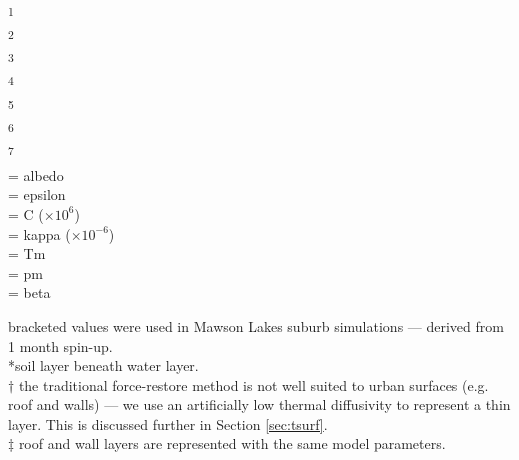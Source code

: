 \documentclass[final,3p,times,authoryear]{elsarticle}
\begin{document}
\begin{table}
\begin{center}
\begin{tabular}{  p{2.5cm} p{1.3cm} p{1.3cm} p{1.3cm} p{1.3cm} p{1.3cm} p{1.3cm} p{1.3cm} p{1.3cm} p{1.3cm}}
\hline
  \end{tabular}
  \end{center}
\footnotesize{\textsuperscript{1} \cite{Oke1987z}\\}
\footnotesize{\textsuperscript{2} \cite{stewart2014evaluation}\\}
\footnotesize{\textsuperscript{3} \cite{Jarvi2014a} \\}
\footnotesize{\textsuperscript{4} \cite{Narita1984} \\ }
\footnotesize{\textsuperscript{5} \cite{Asaeda1993}  \\}
\footnotesize{\textsuperscript{6} \cite{Grimmond1993}\\}
\footnotesize{\textsuperscript{7} \cite{Doll1985}\\}
\footnotesize{ = \glsdesc{albedo}} \\
\footnotesize{ = \glsdesc{epsilon}} \\
\footnotesize{ = \glsdesc{C} ($\times10^{6}$) \\ }
\footnotesize{ = \glsdesc{kappa}  ($\times10^{-6}$)} \\
\footnotesize{ = \glsdesc{Tm}}\\
\footnotesize{ = \glsdesc{pm}} \\
\footnotesize{ = \glsdesc{beta}}


\footnotesize{ bracketed values were used in Mawson Lakes suburb simulations --- derived from 1 month spin-up.}\\
\footnotesize{*soil layer beneath water layer.} \\
\footnotesize{$\dagger$ the traditional force-restore method is not well suited to urban surfaces (e.g. roof and walls)  --- we use an artificially low thermal diffusivity to represent a thin layer. This is discussed further in Section \ref{sec:tsurf}.} \\
$\ddagger$ roof and wall layers are represented with the same model parameters. 
\end{table} 
\end{document}
